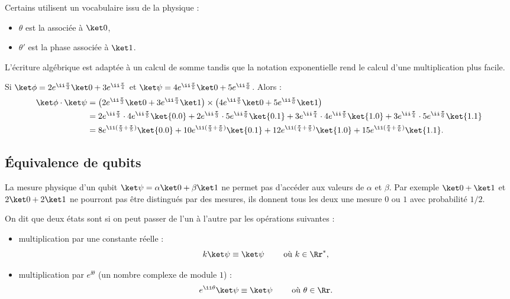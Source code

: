 \documentclass[11pt,class=report,crop=false]{standalone}
\begin{document}
Certains utilisent un vocabulaire issu de la physique :
\begin{itemize}
  \item $\theta$ est la  associée à $\ket0$,
  \item $\theta'$ est la phase associée à $\ket1$.
\end{itemize}

L'écriture algébrique est adaptée à un calcul de somme tandis que la notation exponentielle rend le calcul d'une multiplication plus facile.


\begin{exemple}
Si $\ket\phi = 2e^{\ii \frac\pi3}\ket0+3e^{\ii\frac\pi4}$ et
$\ket\psi = 4e^{\ii \frac\pi5}\ket0+5e^{\ii\frac\pi6}$.
Alors :
\begin{align*}
\ket\phi \cdot \ket\psi 
  &= \left(2e^{\ii \frac\pi3}\ket0+3e^{\ii\frac\pi4}\ket1\right) \times
  \left(4e^{\ii \frac\pi5}\ket0+5e^{\ii\frac\pi6}\ket1\right) \\
  &= 2e^{\ii \frac\pi3} \cdot 4e^{\ii \frac\pi5}\ket{0.0}
  + 2e^{\ii \frac\pi3} \cdot 5e^{\ii\frac\pi6} \ket{0.1}
  + 3e^{\ii\frac\pi4} \cdot 4e^{\ii \frac\pi5}\ket{1.0} 
  + 3e^{\ii\frac\pi4} \cdot 5e^{\ii\frac\pi6} \ket{1.1} \\
  &= 8e^{\ii (\frac\pi3+\frac\pi5)}\ket{0.0}
    + 10e^{\ii (\frac\pi3+\frac\pi6)} \ket{0.1}
    + 12e^{\ii(\frac\pi4+\frac\pi5)}\ket{1.0} 
    + 15e^{\ii(\frac\pi4+\frac\pi6)} \ket{1.1}. \\
\end{align*}
\end{exemple}


\subsection{Équivalence de qubits}

La mesure physique d'un qubit $\ket\psi = \alpha\ket0+\beta\ket1$ ne permet pas d'accéder aux valeurs de $\alpha$ et $\beta$.
Par exemple $\ket0+\ket1$ et $2\ket0+2\ket1$ ne pourront pas être distingués par des mesures, ils donnent tous les deux une mesure $0$ ou $1$ avec probabilité $1/2$.



On dit que deux états sont  si on peut passer de l'un à l'autre par les opérations suivantes :
\begin{itemize}
  \item multiplication par une constante réelle :
$$k \ket\psi \equiv \ket \psi \qquad \text{ où } k \in \Rr^*,$$
  \item multiplication par $e^{\ii\theta}$ (un nombre complexe de module $1$) :
$$e^{\ii \theta} \ket\psi \equiv \ket \psi \qquad \text{ où } \theta \in \Rr.$$
\end{itemize}
\end{document}
